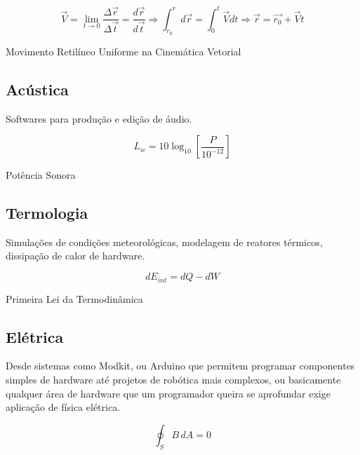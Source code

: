 \documentclass[a4paper]{article}
\begin{document}
\begin{equation}
\vec{V} =\lim_{t\to 0} \frac{\Delta \vec{r}}{\Delta \vec{t}}
      = \frac{d \vec{r}}{d \vec{t}} \Rightarrow \int_{r_0}^{r} d \vec{r} = \int_{0}^{t} \vec{V}dt \Rightarrow \vec{r} = \vec{r_0} + \vec{V}t 
\end{equation}

\begin{center}
Movimento Retilíneo Uniforme na Cinemática Vetorial
\end{center}

\subsection{Acústica}

Softwares para produção e edição de áudio.

\begin{equation}
 L_w = 10 \log_{10} [\frac{P}{10^{-12}}] 
\end{equation}

\begin{center}
Potência Sonora
\end{center}

\subsection{Termologia}

Simulações de condições meteorológicas, modelagem de reatores térmicos, dissipação de calor de hardware.

\begin{equation}
 dE_{int} = dQ - dW 
\end{equation}

\begin{center}
Primeira Lei da Termodinâmica
\end{center}

\subsection{Elétrica}

Desde sistemas como Modkit,  ou Arduino que permitem programar componentes simples de hardware até projetos de robótica mais complexos, ou basicamente qualquer área de hardware que um programador queira se aprofundar exige aplicação de física elétrica.

\begin{equation}
\oint_S B \,dA = 0  
\end{equation}
\end{document}

